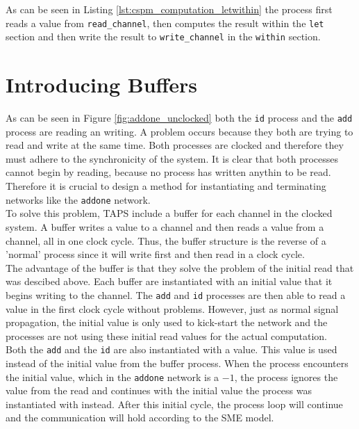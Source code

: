As can be seen in Listing \ref{lst:cspm_computation_letwithin} the process first reads a value from \texttt{read\_channel}, then computes the result within the \texttt{let} section and then write the result to \texttt{write\_channel} in the \texttt{within} section.
\section{Introducing Buffers}
As can be seen in Figure \ref{fig:addone_unclocked} both the \texttt{id} process and the \texttt{add} process are reading an writing. A problem occurs because they both are trying to read and write at the same time. Both processes are clocked and therefore they must adhere to the synchronicity of the system. It is clear that both processes cannot begin by reading, because no process has written anythin to be read. Therefore it is crucial to design a method for instantiating and terminating networks like the \texttt{addone} network.\\

To solve this problem, TAPS include a buffer for each channel in the clocked system. A buffer writes a value to a channel and then reads a value from a channel, all in one clock cycle. Thus, the buffer structure is the reverse of a 'normal' process since it will write first and then read in a clock cycle. \\

The advantage of the buffer is that they solve the problem of the initial read that was descibed above. Each buffer are instantiated with an initial value that it begins writing to the channel. The \texttt{add} and \texttt{id} processes are then able to read a value in the first clock cycle without problems. However, just as normal signal propagation, the initial value is only used to kick-start the network and the processes are not using these initial read values for the actual computation. \\

Both the \texttt{add} and the \texttt{id} are also instantiated with a value. This value is used instead of the initial value from the buffer process. When the process encounters the initial value, which in the \texttt{addone} network is a $-1$, the process ignores the value from the read and continues with the initial value the process was instantiated with instead. After this initial cycle, the process loop will continue and the communication will hold according to the SME model.\\

